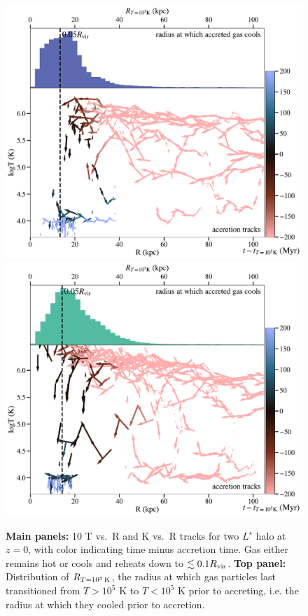 \documentclass[fleqn,usenatbib]{mnras}
\newcommand{\Rcool}{R_{T=10^5\,{\rm K}}}
\begin{document}
\begin{figure}
    \centering
    \includegraphics[width=\columnwidth]{figures/tracks_m12i_md.pdf}
    \includegraphics[width=\columnwidth]{figures/tracks_m12b_md.pdf}
    \caption{
    \textbf{Main panels:} 10 T vs.\ R and K vs.\ R tracks for two $L^\star$ halo at $z=0$, with color indicating time minus accretion time.
    Gas either remains hot or cools and reheats down to $\lesssim 0.1 R_{\rm vir}$. 
    \textbf{Top panel:} Distribution of $\Rcool$, the radius at which gas particles last transitioned from $T > 10^5$ K to $T < 10^5$ K prior to accreting, i.e. the radius at which they cooled prior to accretion.
    }
    \label{f: T vs R}
\end{figure}
\end{document}
